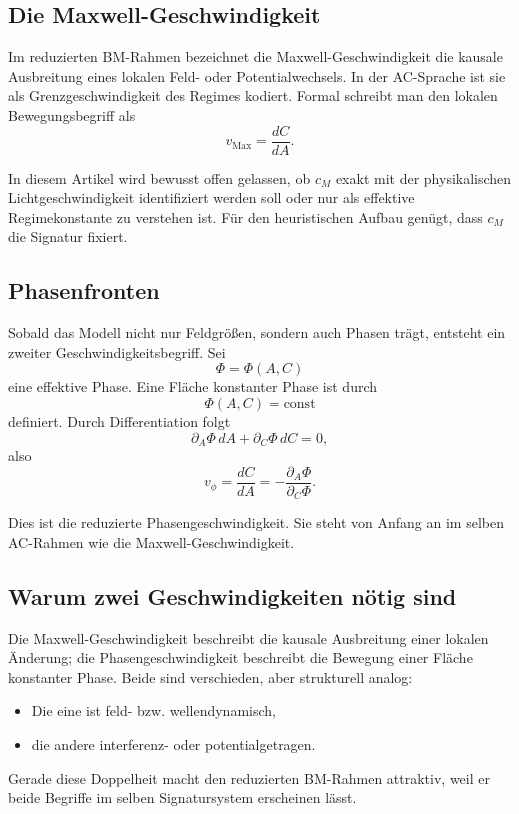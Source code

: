 \documentclass[11pt,a4paper]{article}
\theoremstyle{definition}
\theoremstyle{plain}
\begin{document}
	\subsection{Die Maxwell-Geschwindigkeit}
	
	Im reduzierten BM-Rahmen bezeichnet die Maxwell-Geschwindigkeit die kausale Ausbreitung eines lokalen Feld- oder Potentialwechsels. In der AC-Sprache ist sie als Grenzgeschwindigkeit des Regimes kodiert. Formal schreibt man den lokalen Bewegungsbegriff als
	\[
	v_{\mathrm{Max}} = \frac{dC}{dA}.
	\]
	
	In diesem Artikel wird bewusst offen gelassen, ob $c_M$ exakt mit der physikalischen Lichtgeschwindigkeit identifiziert werden soll oder nur als effektive Regimekonstante zu verstehen ist. Für den heuristischen Aufbau genügt, dass $c_M$ die Signatur fixiert.
	
	\subsection{Phasenfronten}
	
	Sobald das Modell nicht nur Feldgrößen, sondern auch Phasen trägt, entsteht ein zweiter Geschwindigkeitsbegriff. Sei
	\[
	\Phi = \Phi(A,C)
	\]
	eine effektive Phase. Eine Fläche konstanter Phase ist durch
	\[
	\Phi(A,C)=\text{const}
	\]
	definiert. Durch Differentiation folgt
	\[
	\partial_A \Phi\, dA + \partial_C \Phi\, dC = 0,
	\]
	also
	\[
	v_\phi = \frac{dC}{dA} = -\frac{\partial_A \Phi}{\partial_C \Phi}.
	\]
	
	Dies ist die reduzierte Phasengeschwindigkeit. Sie steht von Anfang an im selben AC-Rahmen wie die Maxwell-Geschwindigkeit.
	
	\subsection{Warum zwei Geschwindigkeiten nötig sind}
	
	Die Maxwell-Geschwindigkeit beschreibt die kausale Ausbreitung einer lokalen Änderung; die Phasengeschwindigkeit beschreibt die Bewegung einer Fläche konstanter Phase. Beide sind verschieden, aber strukturell analog:
	\begin{itemize}[leftmargin=2em]
		\item Die eine ist feld- bzw. wellendynamisch,
		\item die andere interferenz- oder potentialgetragen.
	\end{itemize}
	
	Gerade diese Doppelheit macht den reduzierten BM-Rahmen attraktiv, weil er beide Begriffe im selben Signatursystem erscheinen lässt.
	
\end{document}
